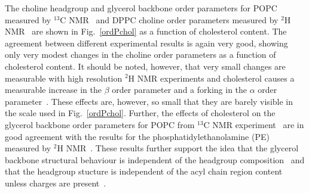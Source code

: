 \documentclass[journal=jacsat,manuscript=article]{achemso}
\begin{document}
The choline headgroup and glycerol backbone order parameters for POPC measured by $^{13}$C NMR~\cite{ferreira13} and DPPC choline order parameters 
measured by $^{2}$H NMR~\cite{brown78} are shown in Fig.~\ref{ordPchol} as a function of cholesterol content.
The agreement between different experimental results is again very good, showing only very modest changes in 
the choline order parameters as a function of cholesterol content. It should be noted, however, that very small
changes are measurable with high resolution $^{2}$H NMR experiments
and cholesterol causes a measurable increase in the $\beta$ order parameter and a forking in the $\alpha$ order
parameter~\cite{brown78}. These effects are, however, so small that they are barely visible in the scale used in Fig.~\ref{ordPchol}.
Further, the effects of cholesterol on the glycerol backbone order parameters for POPC from $^{13}$C NMR experiment~\cite{ferreira13} 
are in good agreement with the results for the phosphatidylethanolamine (PE) measured by $^{2}$H NMR~\cite{ghosh82}.
These results further support the idea that the glycerol backbone structural behaviour is independent of the
headgroup composition~\cite{gally81} and that the headgroup stucture is independent of the acyl chain region content unless
charges are present~\cite{scherer87}.
\end{document}
